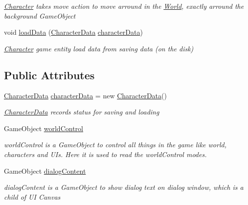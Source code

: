 \begin{DoxyCompactItemize}
\begin{DoxyCompactList}\small\item\em \hyperlink{class_character}{Character} takes move action to move arround in the \hyperlink{class_world}{World}, exactly arround the background Game\+Object \end{DoxyCompactList}\item 
void \hyperlink{class_character_a732de0e82f2e2f2edd9014f91e9df10b}{load\+Data} (\hyperlink{class_character_data}{Character\+Data} \hyperlink{class_character_af86674f9440ec86b61c057dbc1b8586e}{character\+Data})
\begin{DoxyCompactList}\small\item\em \hyperlink{class_character}{Character} game entity load data from saving data (on the disk) \end{DoxyCompactList}\end{DoxyCompactItemize}
\subsection*{Public Attributes}
\begin{DoxyCompactItemize}
\item 
\hyperlink{class_character_data}{Character\+Data} \hyperlink{class_character_af86674f9440ec86b61c057dbc1b8586e}{character\+Data} = new \hyperlink{class_character_data}{Character\+Data}()
\begin{DoxyCompactList}\small\item\em \hyperlink{class_character_data}{Character\+Data} records status for saving and loading \end{DoxyCompactList}\item 
Game\+Object \hyperlink{class_character_acb8eae0fe1b057a002e83b9fe6c5e02c}{world\+Control}
\begin{DoxyCompactList}\small\item\em world\+Control is a Game\+Object to control all things in the game like world, characters and U\+Is. Here it is used to read the world\+Control modes. \end{DoxyCompactList}\item 
Game\+Object \hyperlink{class_character_a9eb4f04ae4acf1fa7666b93d1f5c5da6}{dialog\+Content}
\begin{DoxyCompactList}\small\item\em dialog\+Content is a Game\+Object to show dialog text on dialog window, which is a child of UI Canvas \end{DoxyCompactList}\end{DoxyCompactItemize}


